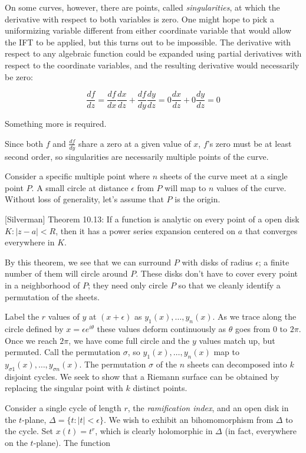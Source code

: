 On some curves, however, there are points, called {\it singularities},
at which the derivative with respect to both variables is zero.
One might hope to pick a uniformizing variable different
from either coordinate variable that would allow the IFT
to be applied, but this turns out to be impossible.  The
derivative with respect to any algebraic function could
be expanded using partial derivatives with respect to
the coordinate variables, and the resulting derivative
would necessarily be zero:

$$\frac{df}{dz} = \frac{df}{dx}\frac{dx}{dz} + \frac{df}{dy}\frac{dy}{dz} = 0\frac{dx}{dz} + 0\frac{dy}{dz} = 0$$

Something more is required.

Since both $f$ and $\frac{df}{dy}$ share a zero at
a given value of $x$, $f$'s zero must be at least
second order, so singularities are necessarily
multiple points of the curve.


Consider a specific multiple point where $n$ sheets of the curve meet
at a single point $P$.  A small circle at distance $\epsilon$ from $P$
will map to $n$ values of the curve.  Without loss of generality,
let's assume that $P$ is the origin.

[Silverman] Theorem 10.13: If a function is analytic on every point of
a open disk $K: |z-a| < R$, then it has a power series expansion
centered on $a$ that converges everywhere in $K$.

By this theorem, we see that we can surround $P$ with disks of radius
$\epsilon$; a finite number of them will circle around $P$.  These
disks don't have to cover every point in a neighborhood of $P$; they
need only circle $P$ so that we cleanly identify a permutation
of the sheets.

Label the $r$ values of $y$ at $(x+\epsilon)$
as $y_1(x),\ldots,y_n(x)$.  As we trace along the circle
defined by $x=\epsilon e^{i\theta}$ these values
deform continuously as $\theta$ goes from $0$ to $2\pi$.
Once we reach $2\pi$, we have come full circle
and the $y$ values match up, but permuted.
Call the permutation $\sigma$,
so $y_1(x),\ldots,y_n(x)$ map to $y_{\sigma 1}(x),\ldots,y_{\sigma n}(x)$.
The permutation $\sigma$ of the $n$
sheets can decomposed into $k$ disjoint cycles.  We seek to
show that a Riemann surface can be obtained by replacing the singular
point with $k$ distinct points.

Consider a single cycle of length $r$, the {\it ramification index},
and an open disk in the $t$-plane, $\Delta=\{t:|t|<\epsilon\}$.
We wish to exhibit an bihomomorphism from $\Delta$ to the
cycle.  Set $x(t)=t^r$, which is clearly holomorphic in $\Delta$
(in fact, everywhere on the $t$-plane).  The function

